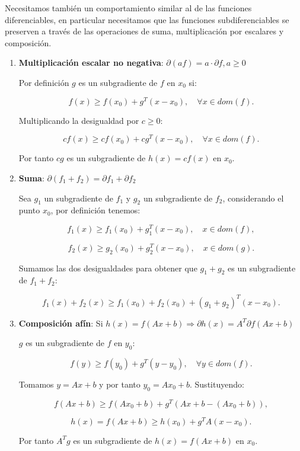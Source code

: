 Necesitamos también un comportamiento similar al de las funciones diferenciables, en particular necesitamos que las funciones subdiferenciables se preserven a través de las operaciones de suma, multiplicación por escalares y composición.

\begin{enumerate}

	\item{\textbf{Multiplicación escalar no negativa}: $\partial (af) = a \cdot \partial f , a\geq0$
	
	Por definición $g$ es un subgradiente de $f$ en $x_0$ si:
	
	$$f(x) \geq f(x_0) + g^T(x-x_0), \quad \forall x \in dom(f).$$

	Multiplicando la desigualdad por $c \geq 0$:

	$$cf(x) \geq cf(x_0) + cg^T(x-x_0), \quad \forall x \in dom(f).$$

	Por tanto $cg$ es un subgradiente de $h(x)=cf(x)$ en $x_0$.

	}
	
	\item{ \textbf{Suma}: $\partial (f_1+f_2) = \partial f_1 + \partial f_2$

	Sea $g_1$ un subgradiente de $f_1$ y $g_2$ un subgradiente de $f_2$, considerando el punto $x_0$, por definición tenemos:

	$$f_1(x) \geq f_1(x_0) + g_1^T(x-x_0), \quad x \in dom(f),$$

	$$f_2(x) \geq g_2(x_0) + g_2^T(x-x_0), \quad x \in dom(g).$$

	Sumamos las dos desigualdades para obtener que $g_1 + g_2$ es un subgradiente de $f_1 + f_2$:

	$$f_1(x) + f_2(x) \geq f_1(x_0) + f_2(x_0) + \left ( g_1 + g_2 \right ) ^T \left ( x - x_0 \right ).$$


	}
	
	\item{ \textbf{Composición afín}: Si $h(x)=f(Ax + b) \Rightarrow \partial h(x)= A^T \partial f(Ax+b)$
	
	$g$ es un subgradiente de $f$ en $y_0$:
	
	$$f(y) \geq f(y_0) + g^T(y-y_0), \quad \forall y \in dom(f).$$

	Tomamos $y=Ax + b$ y por tanto $y_0= Ax_0 + b$. Sustituyendo:

	$$f(Ax + b) \geq f(Ax_0 + b) + g^T(Ax + b - (Ax_0 + b)),$$

	$$h(x)=f(Ax+b) \geq h(x_0) + g^TA(x-x_0).$$

	Por tanto $A^Tg$ es un subgradiente de $h(x)=f(Ax+b)$ en $x_0$.

	}
	
\end{enumerate}


